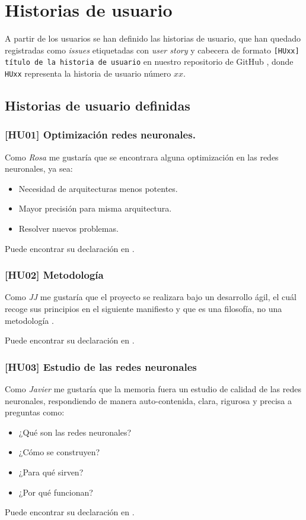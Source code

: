 \section{Historias de usuario}   \label{ch:metodología_personas_historias_de_usuario}

A partir de los usuarios se han definido las historias de usuario, que han quedado registradas 
como \textit{issues} etiquetadas con \textit{user story} y cabecera de formato
\texttt{[HUxx] título de la historia de usuario} en nuestro 
repositorio de GitHub \cite{TFG-Estudio-de-las-redes-neuronales},
 donde \texttt{HUxx} representa
la historia de usuario número $xx$.   

\subsection{Historias de usuario definidas} 

\subsubsection*{[HU01] Optimización redes neuronales.}
    Como \textit{Rosa} me gustaría que se encontrara alguna optimización en las redes neuronales, ya sea:
\begin{itemize}
    \item  Necesidad de arquitecturas menos potentes.
    \item  Mayor precisión para misma arquitectura.
    \item  Resolver nuevos problemas.
\end{itemize}
Puede encontrar su declaración en \cite{TFG-Estudio-de-las-redes-neuronales-HU01}. 

\subsubsection*{ [HU02] Metodología}

Como \textit{JJ} me gustaría que el proyecto se realizara bajo un desarrollo ágil,  el cuál recoge sus principios en el siguiente manifiesto \cite{principios-manifiesto-agil} y que es una filosofía, no una metodología \cite{why-agile-is-not-a-methodology-1} \cite{why-agile-is-not-a-methodology-2}.

Puede encontrar su declaración en \cite{TFG-Estudio-de-las-redes-neuronales-HU02}.  

\subsubsection*{ [HU03] Estudio de las redes neuronales}
Como \textit{Javier} me gustaría que la memoria fuera un estudio de calidad de las redes neuronales, 
respondiendo de manera auto-contenida, clara, rigurosa y precisa a preguntas como:
\begin{itemize}
    \item ¿Qué son las redes neuronales?
    \item ¿Cómo se construyen?
    \item ¿Para qué sirven?
    \item ¿Por qué funcionan?
\end{itemize}
Puede encontrar su declaración en \cite{TFG-Estudio-de-las-redes-neuronales-HU03}.

